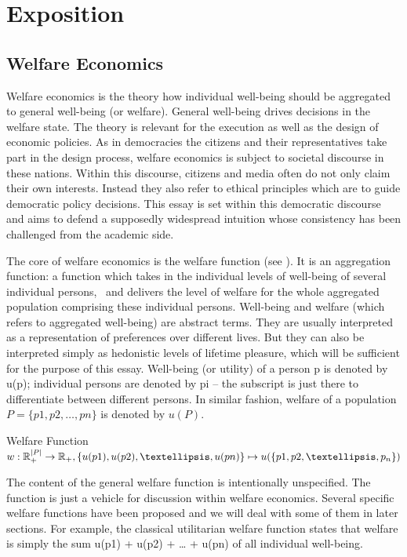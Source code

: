 \chapter{Exposition}
\section{Welfare Economics}

Welfare economics is the theory how individual well-being should be aggregated to general well-being (or welfare). General well-being drives decisions in the welfare state. The theory is relevant for the execution as well as the design of economic policies. As in democracies the citizens and their representatives take part in the design process, welfare economics is subject to societal discourse in these nations. Within this discourse, citizens and media often do not only claim their own interests. Instead they also refer to ethical principles which are to guide democratic policy decisions. This essay is set within this democratic discourse and aims to defend a supposedly widespread intuition whose consistency has been challenged from the academic side.  

The core of welfare economics is the welfare function (see ). It is an aggregation function: a function which takes in the individual levels of well-being of several individual persons, \ and delivers the level of welfare for the whole aggregated population comprising these individual persons. Well-being and welfare (which refers to aggregated well-being) are abstract terms. They are usually interpreted as a representation of preferences over different lives. But they can also be interpreted simply as hedonistic levels of lifetime pleasure, which will be sufficient for the purpose of this essay. Well-being (or utility) of a person p is denoted by u(p); individual persons are denoted by pi – the subscript is just there to differentiate between different persons. In similar fashion, welfare of a population $P = \{ p1, p2, …, pn \}$ is denoted by $u(P)$. 

\begin{Definition}{Welfare Function}{}
$
  w: \hfill
  \mathbb{R}_+^{|P|} \rightarrow \mathbb{R}_+, \hfill
  \{ u(p1), u(p2), …, u(pn) \} \mapsto u( \{ p1, p2, …, p_n \} ) 
$
\end{Definition}

The content of the general welfare function is intentionally unspecified. The function is just a vehicle for discussion within welfare economics. Several specific welfare functions have been proposed and we will deal with some of them in later sections. For example, the classical utilitarian welfare function states that welfare is simply the sum u(p1) + u(p2) + … + u(pn) of all individual well-being.  

